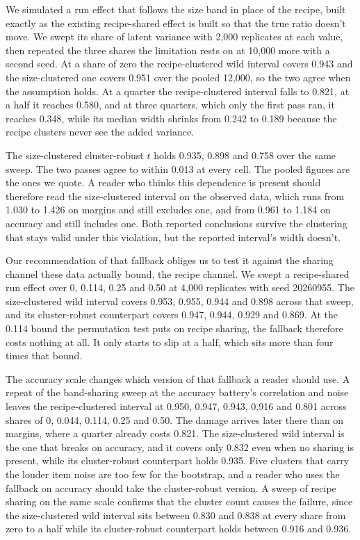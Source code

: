 We simulated a run effect that follows the size band in place of the recipe, built exactly as the existing recipe-shared effect is built so that the true ratio doesn't move. We swept its share of latent variance with 2,000 replicates at each value, then repeated the three shares the limitation rests on at 10,000 more with a second seed. At a share of zero the recipe-clustered wild interval covers 0.943 and the size-clustered one covers 0.951 over the pooled 12,000, so the two agree when the assumption holds. At a quarter the recipe-clustered interval falls to 0.821, at a half it reaches 0.580, and at three quarters, which only the first pass ran, it reaches 0.348, while its median width shrinks from 0.242 to 0.189 because the recipe clusters never see the added variance.

The size-clustered cluster-robust $t$ holds 0.935, 0.898 and 0.758 over the same sweep. The two passes agree to within 0.013 at every cell. The pooled figures are the ones we quote. A reader who thinks this dependence is present should therefore read the size-clustered interval on the observed data, which runs from 1.030 to 1.426 on margins and still excludes one, and from 0.961 to 1.184 on accuracy and still includes one. Both reported conclusions survive the clustering that stays valid under this violation, but the reported interval's width doesn't.

Our recommendation of that fallback obliges us to test it against the sharing channel these data actually bound, the recipe channel. We swept a recipe-shared run effect over 0, 0.114, 0.25 and 0.50 at 4,000 replicates with seed 20260955. The size-clustered wild interval covers 0.953, 0.955, 0.944 and 0.898 across that sweep, and its cluster-robust counterpart covers 0.947, 0.944, 0.929 and 0.869. At the 0.114 bound the permutation test puts on recipe sharing, the fallback therefore costs nothing at all. It only starts to slip at a half, which sits more than four times that bound.

The accuracy scale changes which version of that fallback a reader should use. A repeat of the band-sharing sweep at the accuracy battery's correlation and noise leaves the recipe-clustered interval at 0.950, 0.947, 0.943, 0.916 and 0.801 across shares of 0, 0.044, 0.114, 0.25 and 0.50. The damage arrives later there than on margins, where a quarter already costs 0.821. The size-clustered wild interval is the one that breaks on accuracy, and it covers only 0.832 even when no sharing is present, while its cluster-robust counterpart holds 0.935. Five clusters that carry the louder item noise are too few for the bootstrap, and a reader who uses the fallback on accuracy should take the cluster-robust version. A sweep of recipe sharing on the same scale confirms that the cluster count causes the failure, since the size-clustered wild interval sits between 0.830 and 0.838 at every share from zero to a half while its cluster-robust counterpart holds between 0.916 and 0.936.

